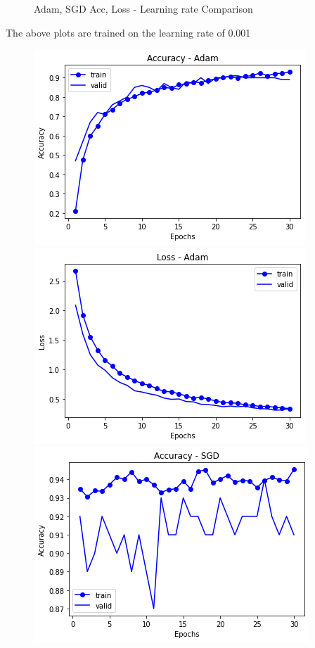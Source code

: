 \begin{figure}[h]
\caption{Adam, SGD Acc,  Loss - Learning rate Comparison}
\end{figure}


The above plots are trained on the learning rate of 0.001

\pagebreak
\begin{figure}[h]
  \centering
  \includegraphics[scale=0.40]{diagrams/vgg16/0.0001lr_graphs/lr0.0001_Adam_acc.png}
  \includegraphics[scale=0.40]{diagrams/vgg16/0.0001lr_graphs/lr0.0001_Adam_loss.png}
  \includegraphics[scale=0.40]{diagrams/vgg16/0.0001lr_graphs/lr0.0001_SGD_acc.png}

\end{figure}

